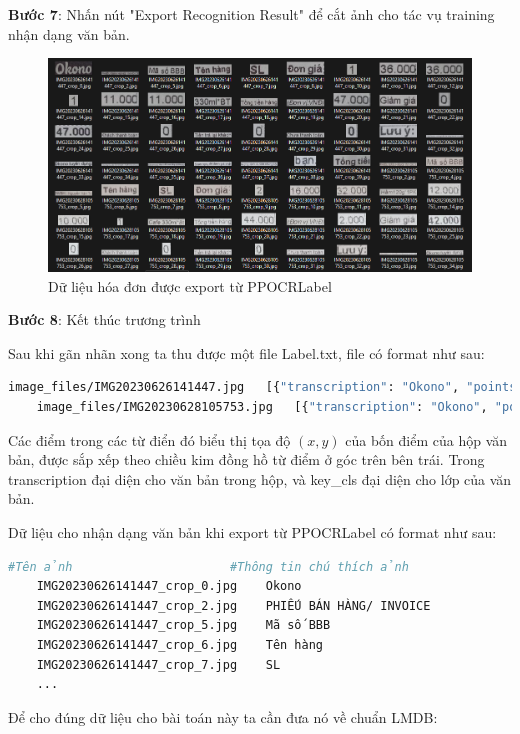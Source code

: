 \textbf{Bước 7}: Nhấn nút "Export Recognition Result" để cắt ảnh cho tác vụ training nhận dạng văn bản.
\begin{figure}[h]
    \includegraphics[scale=0.5]{images/data-invoice-text-recognition.png}
    \centering
    \caption{Dữ liệu hóa đơn được export từ PPOCRLabel}
\end{figure}

\textbf{Bước 8}: Kết thúc trương trình

Sau khi gãn nhãn xong ta thu được một file Label.txt, file có format như sau: 
\begin{lstlisting}[language=bash]
    image_files/IMG20230626141447.jpg	[{"transcription": "Okono", "points": [[440, 195], [807, 201], [805, 333], [438, 327]], "difficult": false, "key_cls": "SELLER"}...]
    image_files/IMG20230628105753.jpg	[{"transcription": "Okono", "points": [[429, 469], [700, 469], [700, 542], [429, 542]], "difficult": true, "key_cls": "SELLER"}...]
\end{lstlisting}

Các điểm trong các từ điển đó biểu thị tọa độ $(x, y)$ của bốn điểm của hộp văn bản, được sắp xếp theo chiều kim đồng hồ từ điểm ở góc trên bên trái. Trong transcription đại diện cho văn bản trong hộp, và key\_cls đại diện cho lớp của văn bản.

Dữ liệu cho nhận dạng văn bản khi export từ PPOCRLabel có format như sau:
\begin{lstlisting}[language=bash]
    #Tên ảnh                      #Thông tin chú thích ảnh
    IMG20230626141447_crop_0.jpg	Okono
    IMG20230626141447_crop_2.jpg	PHIẾU BÁN HÀNG/ INVOICE
    IMG20230626141447_crop_5.jpg	Mã số BBB
    IMG20230626141447_crop_6.jpg	Tên hàng
    IMG20230626141447_crop_7.jpg	SL
    ...
\end{lstlisting}
Để cho đúng dữ liệu cho bài toán này ta cần đưa nó về chuẩn LMDB:

